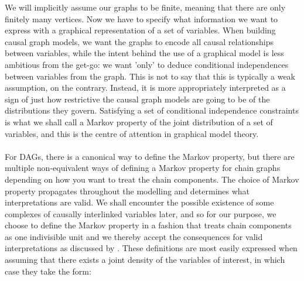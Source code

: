\documentclass[11pt, a4paper]{memoir}
\theoremstyle{break}
\theoremstyle{break}
\theoremstyle{nonumberplain}
\begin{document}
We will implicitly assume our graphs to be finite, meaning that there are only finitely many vertices. Now we have to specify what information we want to express with a graphical representation of a set of variables. When building causal graph models, we want the graphs to encode all causal relationships between variables, while the intent behind the use of a graphical model is less ambitious from the get-go: we want 'only' to deduce conditional independences between variables from the graph. This is not to say that this is typically a weak assumption, on the contrary. Instead, it is more appropriately interpreted as a sign of just how restrictive the causal graph models are going to be of the distributions they govern. Satisfying a set of conditional independence constraints is what we shall call a Markov property of the joint distribution of a set of variables, and this is the centre of attention in graphical model theory.\\\\
For DAGs, there is a canonical way to define the Markov property, but there are multiple non-equivalent ways of defining a Markov property for chain graphs depending on how you want to treat the chain components. The choice of Markov property propagates throughout the modelling and determines what interpretations are valid. We shall encounter the possible existence of some complexes of causally interlinked variables later, and so for our purpose, we choose to define the Markov property in a fashion that treats chain components as one indivisible unit and we thereby accept the consequences for valid interpretations as discussed by \cite{ChainGraph}. These definitions are most easily expressed when assuming that there exists a joint density of the variables of interest, in which case they take the form:
\end{document}
